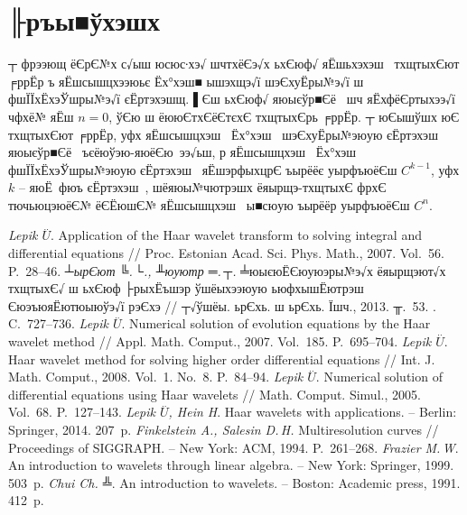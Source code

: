 \documentclass[12pt, a4paper, oneside]{article}
\begin{document}
\section{╟ръы■ўхэшх}
┬ фрээющ ёЄрЄ№х с√ыш юсюс∙хэ√ шчтхёЄэ√х ьхЄюф√ яЁшьхэхэш  тхщтыхЄют ╒ррЁр ъ яЁшсышцхээюьє Ёх°хэш■ ышэхщэ√ї шэЄхуЁры№э√ї ш фшЇЇхЁхэЎшры№э√ї єЁртэхэшщ. ▌Єш ьхЄюф√ яюыєўр■Єё  шч яЁхфёЄртыхээ√ї чфхё№ яЁш $n=0$, ўЄю ш ёююЄтхЄёЄтєхЄ тхщтыхЄрь ╒ррЁр. ┬ юЄышўшх юЄ тхщтыхЄют ╒ррЁр, уфх яЁшсышцхэш  Ёх°хэш  шэЄхуЁры№эюую єЁртэхэш  яюыєўр■Єё  ъєёюўэю-яюёЄю ээ√ьш, р яЁшсышцхэш  Ёх°хэш  фшЇЇхЁхэЎшры№эюую єЁртэхэш  яЁшэрфыхцрЄ ъырёёє уырфъюёЄш $C^{k-1}$, уфх $k$ -- яюЁ фюъ єЁртэхэш , шёяюы№чютрэшх ёяырщэ-тхщтыхЄ фрхЄ тючьюцэюёЄ№ ёЄЁюшЄ№ яЁшсышцхэш  ы■сюую ъырёёр уырфъюёЄш $C^n$.
\begin{thebibliography}{99}
 \textit{Lepik  $\overset{..}{U}$}. Application of the Haar wavelet transform to solving integral and differential equations // Proc. Estonian Acad. Sci. Phys. Math.,  2007. Vol.~56. P.~28--46.
 \textit{┴ырЄют ╚.\,└., ╨юуютр ═.\,┬.} ╧юыєюЁЄюуюэры№э√х ёяырщэют√х тхщтыхЄ√ ш ьхЄюф ├рыхЁъшэр ўшёыхээюую ьюфхышЁютрэш  ЄюэъюяЁютюыюўэ√ї рэЄхэ // ┬√ўшёы. ьрЄхь. ш ьрЄхь. Їшч., 2013. ╥.~53. . C.~727--736.
 \textit{Lepik  $\overset{..}{U}$}. Numerical solution of evolution equations by the Haar wavelet method //  Appl. Math. Comput., 2007.  Vol.~185. P.~695--704.
 \textit{Lepik  $\overset{..}{U}$}. Haar wavelet method for solving higher order differential equations // Int. J. Math. Comput., 2008. Vol.~1. No.~8. P.~84--94.
  \textit{Lepik  $\overset{..}{U}$}. Numerical solution of differential equations using Haar wavelets //  Math. Comput. Simul., 2005. Vol.~68. P.~127--143.
 \textit{Lepik  $\overset{..}{U}$, Hein H}.  Haar wavelets with applications. --  Berlin: Springer, 2014. 207~p.
  \textit{Finkelstein A., Salesin D.\,H.} Multiresolution curves // Proceedings of SIGGRAPH. --  New York: ACM, 1994. P.~261--268.
 \textit{Frazier M.\,W}. An introduction to wavelets through linear algebra. -- New York: Springer,  1999.  503~p.
  \textit{Chui Ch. ╩}.  An introduction to wavelets. -- Boston: Academic press, 1991. 412~p.

\end{thebibliography}
\end{document}
